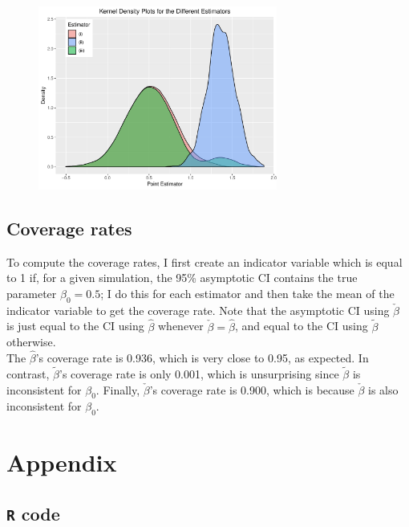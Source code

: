 \documentclass[12pt]{article}
\begin{document}
\begin{figure}[!htpb]
    \centering
    
        \includegraphics[width=0.7\textwidth]{dens.pdf}

\end{figure}

\subsection{Coverage rates}
To compute the coverage rates, I first create an indicator variable which is equal to 1 if, for a given simulation, the 95\% asymptotic CI contains the true parameter $\beta_0 = 0.5$; I do this for each estimator and then take the mean of the indicator variable to get the coverage rate. Note that the asymptotic CI using $\check{\beta}$ is just equal to the CI using $\hat{\beta}$ whenever $\check{\beta}=\hat{\beta}$, and equal to the CI using $\tilde{\beta}$ otherwise.\\

The $\hat{\beta}$'s coverage rate is 0.936, which is very close to 0.95, as expected. In contrast, $\tilde{\beta}$'s coverage rate is only 0.001, which is unsurprising since $\tilde{\beta}$ is inconsistent for $\beta_0$. Finally, $\check{\beta}$'s coverage rate is 0.900, which is because $\check{\beta}$ is also inconsistent for $\beta_0$.

\newpage

\section{Appendix}

\subsection{\texttt{R} code}
\end{document}
